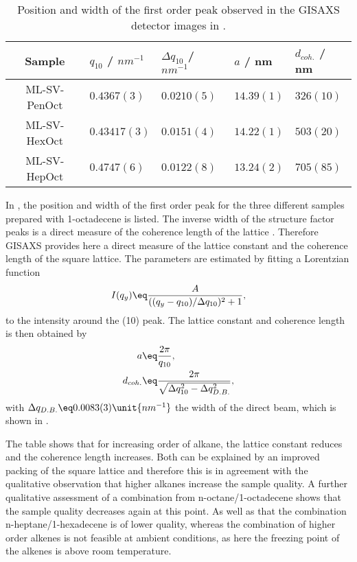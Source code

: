 \documentclass[\main/dresen_thesis.tex]{subfiles}
\begin{document}
  \begin{table}[tb]
    \centering
    \caption{\label{tab:monolayers:solventProperties:GisaxsLatticeParams}Position and width of the first order peak observed in the GISAXS detector images in .}
    \begin{tabular}{ c || l | l || l | l }
      Sample  & $q_{10}$ / $\unit{nm^{-1}}$ & $\Delta q_{10}$ / $nm^{-1}$ & $a$ / nm & $d_{coh.}$ / nm \\
      \hline
      ML-SV-PenOct
        & $0.4367(3)$
        & $0.0210(5)$
        & $14.39(1)$
        & $326(10)$\\
      ML-SV-HexOct
        & $0.43417(3)$
        & $0.0151(4)$
        & $14.22(1)$
        & $503(20)$\\
      ML-SV-HepOct
        & $0.4747(6)$
        & $0.0122(8)$
        & $13.24(2)$
        & $705(85)$\\
      \hline
    \end{tabular}
  \end{table}

  In , the position and width of the first order peak for the three different samples prepared with 1-octadecene is listed.
  The inverse width of the structure factor peaks is a direct measure of the coherence length of the lattice \cite{Renaud_2009_Probi}.
  Therefore GISAXS provides here a direct measure of the lattice constant and the coherence length of the square lattice.
  The parameters are estimated by fitting a Lorentzian function
  \begin{align}
    I(q_y) \eq \frac{A} {((q_y - q_{10})/\Delta q_{10})^2 + 1},
  \end{align}
  to the intensity around the (10) peak.
  The lattice constant and coherence length is then obtained by
  \begin{align}
    a &\eq \frac{2 \pi}{q_{10}}, \\
    d_{coh.} &\eq \frac{2 \pi}{\sqrt{ \Delta q_{10}^2 - \Delta q_{D.B.}^2 }},
  \end{align}
  with $\Delta q_{D.B.} \eq 0.0083(3) \unit{nm^{-1}}$ the width of the direct beam, which is shown in .

  The table shows that for increasing order of alkane, the lattice constant reduces and the coherence length increases.
  Both can be explained by an improved packing of the square lattice and therefore this is in agreement with the qualitative observation that higher alkanes increase the sample quality.
  A further qualitative assessment of a combination from n-octane/1-octadecene shows that the sample quality decreases again at this point.
  As well as that the combination n-heptane/1-hexadecene is of lower quality, whereas the combination of higher order alkenes is not feasible at ambient conditions, as here the freezing point of the alkenes is above room temperature.
\end{document}
